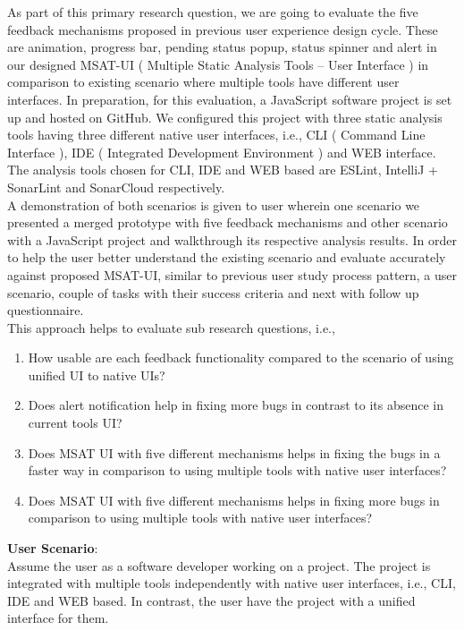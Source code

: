 As part of this primary research question, we are going to evaluate the five feedback mechanisms proposed in previous user experience design cycle. These are animation, progress bar, pending status popup, status spinner and alert in our designed MSAT-UI ( Multiple Static Analysis Tools – User Interface ) in comparison to existing scenario where multiple tools have different user interfaces. In preparation, for this evaluation, a JavaScript software project is set up and hosted on GitHub. We configured this project with three static analysis tools having three different native user interfaces, i.e., CLI ( Command Line Interface ), IDE ( Integrated Development Environment ) and WEB interface. The analysis tools chosen for CLI, IDE and WEB based are ESLint, IntelliJ + SonarLint and SonarCloud respectively. \\

A demonstration of both scenarios is given to user wherein one scenario we presented a merged prototype with five feedback mechanisms and other scenario with a JavaScript project and walkthrough its respective analysis results. In order to help the user better understand the existing scenario and evaluate accurately against proposed MSAT-UI, similar to previous user study process pattern, a user scenario, couple of tasks with their success criteria and next with follow up questionnaire. \\

This approach helps to evaluate sub research questions, i.e., \\

\begin{enumerate}
\item How usable are each feedback functionality compared to the scenario of using unified UI to native UIs?
\item Does alert notification help in fixing more bugs in contrast to its absence in current tools UI?
\item Does MSAT UI with five different mechanisms helps in fixing the bugs in a faster way in comparison to using multiple tools with native user interfaces?
\item Does MSAT UI with five different mechanisms helps in fixing more bugs in comparison to using multiple tools with native user interfaces?
\end{enumerate}

\textbf{User Scenario}: \\

Assume the user as a software developer working on a project. The project is integrated with multiple tools independently with native user interfaces, i.e., CLI, IDE and WEB based. In contrast, the user have the project with a unified interface for them. \\


